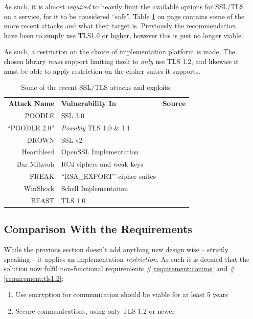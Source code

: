 		As such, it is almost \emph{required} to heavily limit the available options for SSL/TLS on a service, for it to be considered ``safe''. Table \ref{table:ssl/tls} on page \pageref{table:ssl/tls} contains some of the more recent attacks and what their target is. Previously the recommendation have been to simply use TLS1.0 or higher\cite{ms_tls1.0+}, however this is just no longer viable. 

		As such, a restriction on the choice of implementation platform is made. The chosen library \emph{must} support limiting itself to \emph{only} use TLS 1.2, and likewise it must be able to apply restriction on the cipher suites it supports.

		\begin{table}
			\begin{tabular}{r | l | l}
				\textbf{Attack Name}	& \textbf{Vulnerability In}			& \textbf{Source} 						\\
				POODLE  				& SSL 3.0							& \cite{moller2014poodle}				\\
				``POODLE 2.0'' 			& \emph{Possibly} TLS 1.0 \& 1.1 	& \cite{poodlev2,poodlev2_2}			\\
				DROWN 					& SSL v2  							& \cite{aviramdrown}					\\
				Heartbleed 				& OpenSSL Implementation			& \cite{durumeric2014matter}			\\
				Bar Mitzvah 			& RC4 ciphers and weak keys 		& \cite{mantin2015barmitzvah}			\\
				FREAK 					& ``RSA\_EXPORT'' cipher suites 	& \cite[p.3]{novotnyimplementation}		\\
				WinShock 				& Schell Implementation 			& \cite[p.2]{novotnyimplementation} 	\\
				BEAST 					& TLS 1.0 							& \cite{beast} 								\\
			\end{tabular}
			\caption{Some of the recent SSL/TLS attacks and exploits.}
			\label{table:ssl/tls}
		\end{table}


		\subsection{Comparison With the Requirements}
			\label{requirement:fulfilled:comms}
			\label{requirement:fulfilled:tls1.2}
			While the previous section doesn't add anything new design wise -- strictly speaking -- it applies an implementation \emph{restriction}. As such it is deemed that the solution now fulfil non-functional requirements \#\ref{requirement:comms} and \#\ref{requirement:tls1.2}:
			\vspace{-3ex}\begin{enumerate}
				\setlength\itemsep{0.1em}
				\setcounter{enumi}{5-1}
				\item Use encryption for communication should be viable for at least 5 years
				\item Secure communications, using only TLS 1.2 or newer 
			\end{enumerate}

